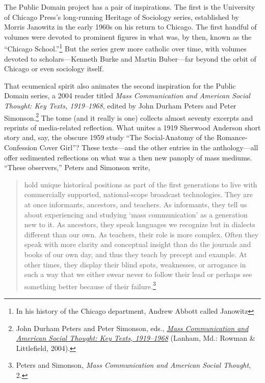 \documentclass[twoside,nohyper,openany,nobib]{tufte-book}
\begin{document}
The Public Domain project has a pair of inspirations. The first is the
University of Chicago Press's long-running Heritage of Sociology series,
established by Morris Janowitz in the early 1960s on his return to
Chicago. The first handful of volumes were devoted to prominent figures
in what was, by then, known as the ``Chicago School.''\footnote{In his history of the Chicago department, Andrew Abbott called
  Janowitz} But the series
grew more catholic over time, with volumes devoted to scholars---Kenneth
Burke and Martin Buber---far beyond the orbit of Chicago or even
sociology itself.

That ecumenical spirit also animates the second inspiration for the
Public Domain series, a 2004 reader titled \emph{Mass Communication and
American Social Thought: Key Texts, 1919--1968}, edited by John Durham
Peters and Peter Simonson.\footnote{John Durham Peters and Peter Simonson, eds.,
  \emph{\href{http://www.worldcat.org/oclc/54374652}{Mass Communication
  and American Social Thought: Key Texts, 1919--1968}} (Lanham, Md.:
  Rowman \& Littlefield, 2004).} The tome (and it really is one) collects
almost seventy excerpts and reprints of media-related reflection. What
unites a 1919 Sherwood Anderson short story and, say, the obscure 1959
study ``The Social-Anatomy of the Romance-Confession Cover Girl''? These
texts---and the other entries in the anthology---all offer sedimented
reflections on what was a then new panoply of mass mediums. ``These
observers,'' Peters and Simonson write,

\begin{quote}
hold unique historical positions as part of the first generations to
live with commercially supported, national-scope broadcast technologies.
They are at once informants, ancestors, and teachers. As informants,
they tell us about experiencing and studying `mass communication' as a
generation new to it. As ancestors, they speak languages we recognize
but in dialects different than our own. As teachers, their role is more
complex. Often they speak with more clarity and conceptual insight than
do the journals and books of our own day, and thus they teach by precept
and example. At other times, they display their blind spots, weaknesses,
or arrogance in such a way that we either swear never to follow their
lead or perhaps see something better because of their failure.\footnote{Peters and Simonson, \emph{Mass Communication and American Social
  Thought}, 2.}
\end{quote}
\end{document}
